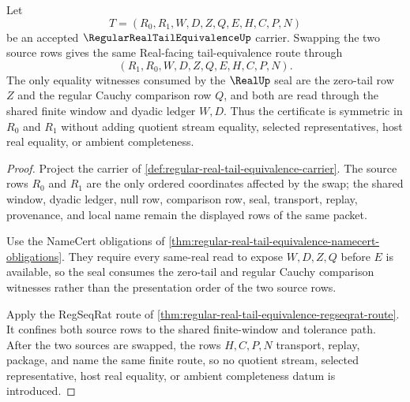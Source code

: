 \begin{theorem}
\label{thm:regular-real-tail-equivalence-zero-tail-symmetry}
Let
$$
T=(R_0,R_1,W,D,Z,Q,E,H,C,P,N)
$$
be an accepted $\RegularRealTailEquivalenceUp$ carrier. Swapping the two source rows gives the same Real-facing tail-equivalence route through
$$
(R_1,R_0,W,D,Z,Q,E,H,C,P,N).
$$
The only equality witnesses consumed by the $\RealUp$ seal are the zero-tail row $Z$ and the regular Cauchy comparison row $Q$, and both are read through the shared finite window and dyadic ledger $W,D$. Thus the certificate is symmetric in $R_0$ and $R_1$ without adding quotient stream equality, selected representatives, host real equality, or ambient completeness.
\end{theorem}
\begin{proof}
Project the carrier of \autoref{def:regular-real-tail-equivalence-carrier}. The source rows $R_0$ and $R_1$ are the only ordered coordinates affected by the swap; the shared window, dyadic ledger, null row, comparison row, seal, transport, replay, provenance, and local name remain the displayed rows of the same packet.

Use the NameCert obligations of \autoref{thm:regular-real-tail-equivalence-namecert-obligations}. They require every same-real read to expose $W,D,Z,Q$ before $E$ is available, so the seal consumes the zero-tail and regular Cauchy comparison witnesses rather than the presentation order of the two source rows.

Apply the RegSeqRat route of \autoref{thm:regular-real-tail-equivalence-regseqrat-route}. It confines both source rows to the shared finite-window and tolerance path. After the two sources are swapped, the rows $H,C,P,N$ transport, replay, package, and name the same finite route, so no quotient stream, selected representative, host real equality, or ambient completeness datum is introduced.
\end{proof}

